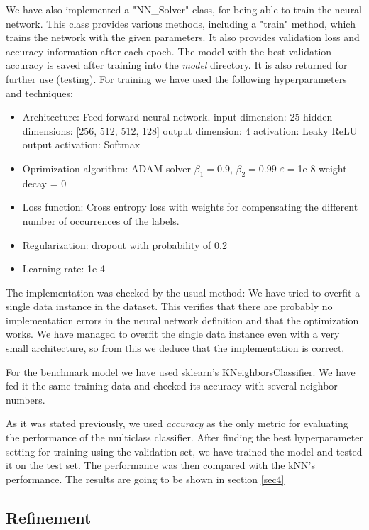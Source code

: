 We have also implemented a "NN\_Solver" class, for being able to train the neural network. This class provides various methods, including a "train" method, which trains the network with the given parameters. It also provides validation loss and accuracy information after each epoch. The model with the best validation accuracy is saved after training into the \textit{model} directory. It is also returned for further use (testing). For training we have used the following hyperparameters and techniques:

\begin{itemize}
	\item Architecture: Feed forward neural network.
		\subitem input dimension: 25
		\subitem hidden dimensions: [256, 512, 512, 128]
		\subitem output dimension: 4
		\subitem activation: Leaky ReLU
		\subitem output activation: Softmax
	\item Oprimization algorithm: ADAM solver
		\subitem $\beta_1 = 0.9$, $\beta_2 = 0.99$
		\subitem $\varepsilon = $1e-8
		\subitem weight decay = 0
	\item Loss function: Cross entropy loss with weights for compensating the different number of occurrences of the labels.
	\item Regularization: dropout with probability of 0.2
	\item Learning rate: 1e-4
\end{itemize}

The implementation was checked by the usual method: We have tried to overfit a single data instance in the dataset. This verifies that there are probably no implementation errors in the neural network definition and that the optimization works. We have managed to overfit the single data instance even with a very small architecture, so from this we deduce that the implementation is correct.

For the benchmark model we have used sklearn's KNeighborsClassifier. We have fed it the same training data and checked its accuracy with several neighbor numbers.

As it was stated previously, we used \textit{accuracy} as the only metric for evaluating the performance of the multiclass classifier. After finding the best hyperparameter setting for training using the validation set, we have trained the model and tested it on the test set. The performance was then compared with the kNN's performance. The results are going to be shown in section \ref{sec4}

\subsection{Refinement} \label{sec3.5}

